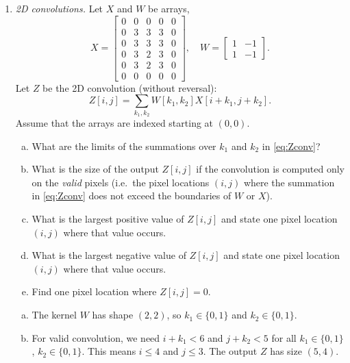 \documentclass[11pt]{article}
\def\beq{\begin{equation}}
\def\eeq{\end{equation}}
\begin{document}
\begin{enumerate}
\item \emph{2D convolutions.}  Let $X$ and $W$ be arrays,
\[
    X = \left[ \begin{array}{ccccc}
        0 & 0 & 0 & 0 & 0 \\
        0 & 3 & 3 & 3 & 0 \\
        0 & 3 & 3 & 3 & 0 \\
        0 & 3 & 2 & 3 & 0 \\
        0 & 3 & 2 & 3 & 0 \\
        0 & 0 & 0 & 0 & 0
        \end{array} \right], \quad
    W = \left[ \begin{array}{cc}
        1 & -1 \\
        1 & -1
        \end{array} \right].
\]
Let $Z$ be the 2D convolution (without reversal):
\beq \label{eq:Zconv}
    Z[i,j] = \sum_{k_1,k_2} W[k_1,k_2]X[i+k_1,j+k_2].
\eeq
Assume that the arrays are indexed starting at $(0,0)$.
\begin{enumerate}[(a)]
\item What are the limits of the summations over $k_1$ and $k_2$ in \eqref{eq:Zconv}?
\item What is the size of the output $Z[i,j]$ if the convolution is computed only on the \emph{valid} pixels (i.e.\ the pixel locations $(i,j)$
where the summation in \eqref{eq:Zconv} does not exceed the boundaries of $W$ or $X$).
\item What is the largest positive value of $Z[i,j]$ and state one pixel location $(i,j)$ where that value occurs.
\item What is the largest negative value of $Z[i,j]$ and state one pixel location $(i,j)$ where that value occurs.
\item Find one pixel location where $Z[i,j]=0$.
\end{enumerate}

\begin{solution}
\begin{enumerate}[(a)]
\item The kernel $W$ has shape $(2,2)$, so $k_1 \in \{0,1\}$ and $k_2 \in \{0,1\}$.

\item For valid convolution, we need $i+k_1 < 6$ and $j+k_2 < 5$ for all $k_1 \in \{0,1\}$, $k_2 \in \{0,1\}$.
This means $i \leq 4$ and $j \leq 3$.
The output $Z$ has size $(5, 4)$.


\end{enumerate}
\end{solution}
\end{enumerate}
\end{document}
